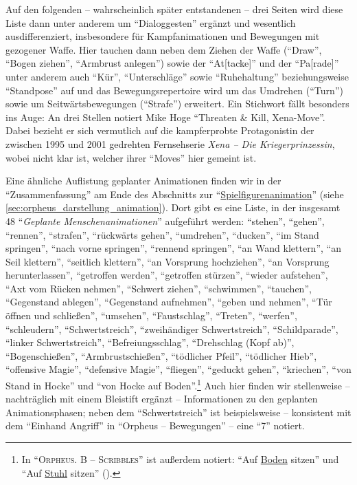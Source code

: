 \documentclass[a5paper,pagesize,numbers=noenddot]{scrbook}
\begin{document}
Auf den folgenden -- wahrscheinlich später entstandenen -- drei Seiten wird diese Liste dann unter anderem um \enquote{Dialoggesten} ergänzt und wesentlich ausdifferenziert, insbesondere für Kampfanimationen und Bewegungen mit gezogener Waffe.
Hier tauchen dann neben dem Ziehen der Waffe (\enquote{Draw}, \enquote{Bogen ziehen}, \enquote{Armbrust anlegen}) sowie der \enquote{At[tacke]} und der \enquote{Pa[rade]} unter anderem auch \enquote{Kür}, \enquote{Unterschläge} sowie \enquote{Ruhehaltung} beziehungsweise \enquote{Standpose} auf und das Bewegungsrepertoire wird um das Umdrehen (\enquote{Turn}) sowie um Seitwärtsbewegungen (\enquote{Strafe}) erweitert.
Ein Stichwort fällt besonders ins Auge:
An drei Stellen notiert Mike Hoge \enquote{Threaten \& Kill, Xena-Move}.
Dabei bezieht er sich vermutlich auf die kampferprobte Protagonistin der zwischen 1995 und 2001 gedrehten Fernsehserie \textit{Xena -- Die Kriegerprinzessin}, wobei nicht klar ist, welcher ihrer \enquote{Moves} hier gemeint ist. %

Eine ähnliche Auflistung geplanter Animationen finden wir in der \enquote{Zusammenfassung} am Ende des Abschnitts zur \enquote{\uline{Spielfigurenanimation}} (siehe \autoref{sec:orpheus_darstellung_animation}).
Dort gibt es eine Liste, in der insgesamt 48 \enquote{\textit{Geplante Menschenanimationen}} aufgeführt werden:
\enquote{stehen}, \enquote{gehen}, \enquote{rennen}, \enquote{strafen}, \enquote{rückwärts gehen}, \enquote{umdrehen}, \enquote{ducken}, \enquote{im Stand springen}, \enquote{nach vorne springen}, \enquote{rennend springen}, \enquote{an Wand klettern}, \enquote{an Seil klettern}, \enquote{seitlich klettern}, \enquote{an Vorsprung hochziehen}, \enquote{an Vorsprung herunterlassen}, \enquote{getroffen werden}, \enquote{getroffen stürzen}, \enquote{wieder aufstehen}, \enquote{Axt vom Rücken nehmen}, \enquote{Schwert ziehen}, \enquote{schwimmen}, \enquote{tauchen}, \enquote{Gegenstand ablegen}, \enquote{Gegenstand aufnehmen}, \enquote{geben und nehmen}, \enquote{Tür öffnen und schließen}, \enquote{umsehen}, \enquote{Faustschlag}, \enquote{Treten}, \enquote{werfen}, \enquote{schleudern}, \enquote{Schwertstreich}, \enquote{zweihändiger Schwertstreich}, \enquote{Schildparade}, \enquote{linker Schwertstreich}, \enquote{Befreiungsschlag}, \enquote{Drehschlag (Kopf ab)}, \enquote{Bogenschießen}, \enquote{Armbrustschießen}, \enquote{tödlicher Pfeil}, \enquote{tödlicher Hieb}, \enquote{offensive Magie}, \enquote{defensive Magie}, \enquote{fliegen}, \enquote{geduckt gehen}, \enquote{kriechen}, \enquote{von Stand in Hocke} und \enquote{von Hocke auf Boden}.\footnote{In \enquote{\textsc{Orpheus. B -- Scribbles}} ist außerdem notiert: \enquote{Auf \uline{Boden} sitzen} und \enquote{Auf \uline{Stuhl} sitzen} (\autocite[S.~8]{orpheus_b_scribbles}).}
Auch hier finden wir stellenweise -- nachträglich mit einem Bleistift ergänzt -- Informationen zu den geplanten Animationsphasen; neben dem \enquote{Schwertstreich} ist beispielsweise -- konsistent mit dem \enquote{Einhand Angriff} in \enquote{Orpheus -- Bewegungen} -- eine \enquote{7} notiert.
\end{document}
